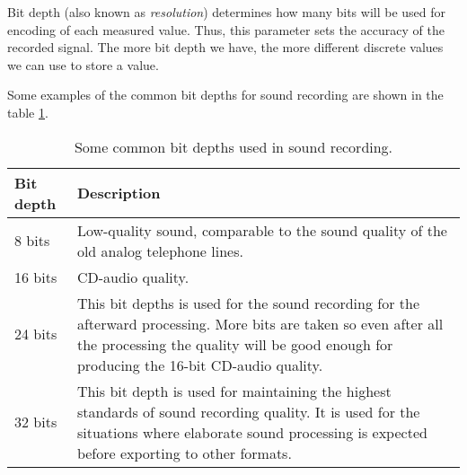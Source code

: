 \documentclass[../sparc.tex]{subfiles}
\begin{document}
Bit depth (also known as \emph{resolution}) determines how many bits will be
used for encoding of each measured value.  Thus, this parameter sets the
accuracy of the recorded signal.  The more bit depth we have, the more different
discrete values we can use to store a value.  \cite{audacityteam:bit-depth}

Some examples of the common bit depths for sound recording are shown in the
table \ref{table:adc-sound-bit-depth-1}.

\begin{table}[h]
  \centering
  \begin{tabular}{p{2cm}|p{9cm}}
    Bit depth & Description \\
    \hline \hline

    8 bits & Low-quality sound, comparable to the sound quality of the old
    analog telephone lines. \\

    \hline

    16 bits & CD-audio quality. \\

    \hline

    24 bits & This bit depths is used for the sound recording for the afterward
    processing.  More bits are taken so even after all the processing the
    quality will be good enough for producing the 16-bit CD-audio quality. \\

    \hline

    32 bits & This bit depth is used for maintaining the highest standards of
    sound recording quality.  It is used for the situations where elaborate
    sound processing is expected before exporting to other formats. \\

    \hline

  \end{tabular}
  \caption{Some common bit depths used in sound recording.}
  \label{table:adc-sound-bit-depth-1}
\end{table}

\end{document}
